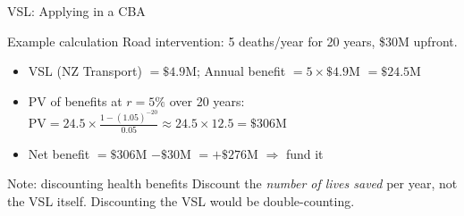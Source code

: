 \documentclass[aspectratio=169, 12pt]{beamer}
\begin{document}
\begin{frame}{VSL: Applying in a CBA}
  \begin{block}{Example calculation}
    \small Road intervention: 5 deaths/year for 20 years, \$30M upfront.
    \begin{itemize}
      \item VSL (NZ Transport) $= \$4.9$M; Annual benefit $= 5 \times \$4.9$M $= \$24.5$M
      \item PV of benefits at $r = 5\%$ over 20 years:
            $\text{PV} = 24.5 \times \frac{1 - (1.05)^{-20}}{0.05} \approx 24.5 \times 12.5 = \$306$M
      \item Net benefit $= \$306$M $- \$30$M $= +\$276$M $\Rightarrow$ fund it
    \end{itemize}
  \end{block}
  \vspace{0.15em}
  \begin{alertblock}{Note: discounting health benefits}
    \small Discount the \emph{number of lives saved} per year, not the VSL itself.
    Discounting the VSL would be double-counting.
  \end{alertblock}
\end{frame}

\end{document}
